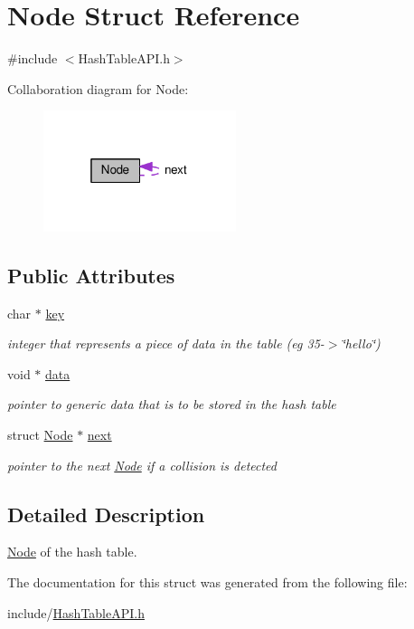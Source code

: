 \hypertarget{structNode}{}\section{Node Struct Reference}
\label{structNode}


{\ttfamily \#include $<$Hash\+Table\+A\+P\+I.\+h$>$}



Collaboration diagram for Node\+:\nopagebreak
\begin{figure}[H]
\begin{center}
\leavevmode
\includegraphics[width=160pt]{structNode__coll__graph}
\end{center}
\end{figure}
\subsection*{Public Attributes}
\begin{DoxyCompactItemize}
\item 
\mbox{\label{structNode_ad88c9a757bfafd5ff265e0837b150056}} 
char $\ast$ \hyperlink{structNode_ad88c9a757bfafd5ff265e0837b150056}{key}
\begin{DoxyCompactList}\small\item\em integer that represents a piece of data in the table (eg 35-\/$>$\char`\"{}hello\char`\"{}) \end{DoxyCompactList}\item 
\mbox{\label{structNode_a38b733496e3eff5e0b4fcb11cd9b866a}} 
void $\ast$ \hyperlink{structNode_a38b733496e3eff5e0b4fcb11cd9b866a}{data}
\begin{DoxyCompactList}\small\item\em pointer to generic data that is to be stored in the hash table \end{DoxyCompactList}\item 
\mbox{\label{structNode_af67b110ca1a258b793bf69d306929b22}} 
struct \hyperlink{structNode}{Node} $\ast$ \hyperlink{structNode_af67b110ca1a258b793bf69d306929b22}{next}
\begin{DoxyCompactList}\small\item\em pointer to the next \hyperlink{structNode}{Node} if a collision is detected \end{DoxyCompactList}\end{DoxyCompactItemize}


\subsection{Detailed Description}
\hyperlink{structNode}{Node} of the hash table. 

The documentation for this struct was generated from the following file\+:\begin{DoxyCompactItemize}
\item 
include/\hyperlink{HashTableAPI_8h}{Hash\+Table\+A\+P\+I.\+h}\end{DoxyCompactItemize}
